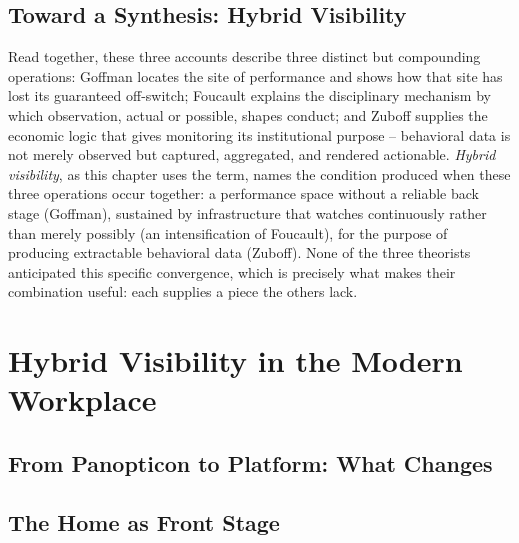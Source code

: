 \documentclass[11pt]{article}
\begin{document}
\subsection{Toward a Synthesis: Hybrid Visibility}

Read together, these three accounts describe three distinct but
compounding operations: Goffman locates the site of performance and
shows how that site has lost its guaranteed off-switch; Foucault
explains the disciplinary mechanism by which observation, actual or
possible, shapes conduct; and Zuboff supplies the economic logic
that gives monitoring its institutional purpose -- behavioral data
is not merely observed but captured, aggregated, and rendered
actionable. \textit{Hybrid visibility}, as this chapter uses the
term, names the condition produced when these three operations occur
together: a performance space without a reliable back stage
(Goffman), sustained by infrastructure that watches continuously
rather than merely possibly (an intensification of Foucault), for
the purpose of producing extractable behavioral data (Zuboff).
None of the three theorists anticipated this specific convergence,
which is precisely what makes their combination useful: each
supplies a piece the others lack.

\section{Hybrid Visibility in the Modern Workplace}
\label{sec:hybrid}

\subsection{From Panopticon to Platform: What Changes}

\subsection{The Home as Front Stage}
\end{document}
